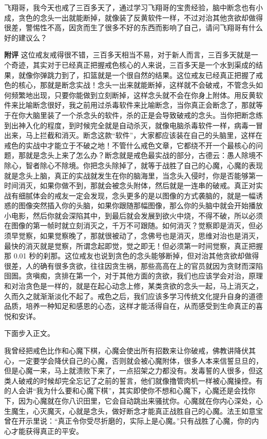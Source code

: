 \begin{case}
    飞翔哥，我今天也戒了三百多天了，通过学习飞翔哥的宝贵经验，脑中断念也有小成，贪色的念头一出就能断掉，就像装了反黄软件一样，不过对治其他贪欲却做得很差，警惕性不高，因贪而生了很多不好的东西而影响了自己，请问飞翔哥有什么好的建议么？

    \textbf{附评} 这位戒友戒得很不错，三百多天相当不易，对于新人而言，三百多天就是一个奇迹，其实对于已经真正把握戒色核心的人来说，三百多天是一个水到渠成的结果，就像你弹跳力到了，扣篮就是一个很自然的结果。这位戒友已经真正把握了戒色的核心，那就是断念实战！念头一出来就能断掉，这样就不会破戒，不管念头如何频繁地出现，只要你能做到立刻断掉，这样念头就不会在你身上附体。用反黄软件来比喻断念很好，我之前用过杀毒软件来比喻断念，当你真正会断念了，那就等于在你大脑里装了一个杀念头的软件，杀的正是会导致破戒的念头。当你把断念练到出神入化的程度，到时候完全就是自动杀灭，就像电脑杀毒软件一样，病毒一冒出来，马上拦截和消灭。断念这款“软件”，大家都应该装在自己的头脑里，这样在戒色的实战中才能立于不破之地！不管什么戒色文章，它都绕不开一个最核心的问题，那就是念头上来了怎么办？断念就是戒色最实战的部分，古德云：愚人除境不除心，智者除心不除境。你把念头除掉了，就等于战胜了自己的心魔，心魔的表现就是念头上脑，真正的实战就发生在你的脑海里，当念头入侵时，你是否能够第一时间消灭，如果你做不到，那就会被念头附体，然后就是一连串的破戒。真正对实战有细腻体会的戒友一定会发现，念头更多的是以图像的方式袭脑的，就是一幅诱惑的图像突然插入你的头脑，如果你跟随那幅图像，那么你的头脑中就会开始播放小电影，然后你就会深陷其中，到最后就会发展到欲火中烧，不得不破，所以必须在图像的第一帧时就立刻消灭之，千万不可跟随。如何消灭？觉察即是消灭，但必须早觉察，如果觉察晚了，那就很被动了，念佛号也是消灭，思维对治也是消灭，最快的消灭就是觉察，所谓念起即觉，觉之即无！但必须第一时间觉察，真正把握那 0.01 秒的刹那。这位戒友也说到贪色的念头能够断掉，但对治其他贪欲却做得很差，人的确有很多贪欲，往往因贪生祸，那些高高在上的官员就因为贪财而深陷囹圄。贪嗔痴，贪排在第一个，对于其他方面的贪欲，我们也应该学会对治，原理和对治贪色是一样的，就是在起心动念上修，某类贪欲的念头一起，马上消灭之，久而久之就渐渐淡化不起了。戒色之后，我们应该多学习传统文化提升自身的道德品质，培养一种知足和感恩的心态，这样才能活得自在，从而感受到生命真正的喜悦和安详。
\end{case}

下面步入正文。

我曾经把戒色比作和心魔下棋，心魔会使出所有招数来让你破戒，佛教讲降伏其心，一定要学会降伏自己的心魔，否则就会被心魔附体，很多人本来信誓旦旦的，但是心魔一来，马上就溃败下来了，一点招架之力都没有。发毒誓的人很多，但这类人破戒的时候却完全忘记了之前的誓言，他们就像撸管肉机一样被心魔操控。有的人会讲“我为什么要和心魔下棋”，其实即使你不想和心魔下，心魔还是会找你下，因为心魔就在你八识田里，它会自动跳出来骚扰你。心魔就在你内心深处，心生魔生，心灭魔灭，心就是念头，做好断念才能真正战胜自己的心魔。法王如意宝曾在开示里说：“真正令你受尽折磨的，实际上是心魔。”只有战胜了心魔，你的内心才能获得真正的平安。

